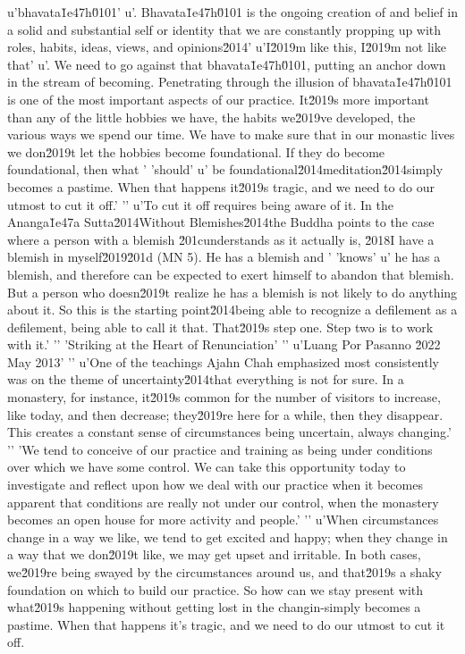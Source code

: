 u'bhavata\u1e47h\u0101'
u'. Bhavata\u1e47h\u0101 is the ongoing creation of and belief in a solid and substantial self or identity that we are constantly propping up with roles, habits, ideas, views, and opinions\u2014'
u'I\u2019m like this, I\u2019m not like that'
u'. We need to go against that bhavata\u1e47h\u0101, putting an anchor down in the stream of becoming. Penetrating through the illusion of bhavata\u1e47h\u0101 is one of the most important aspects of our practice. It\u2019s more important than any of the little hobbies we have, the habits we\u2019ve developed, the various ways we spend our time. We have to make sure that in our monastic lives we don\u2019t let the hobbies become foundational. If they do become foundational, then what '
'should'
u' be foundational\u2014meditation\u2014simply becomes a pastime. When that happens it\u2019s tragic, and we need to do our utmost to cut it off.'
'\n'
u'To cut it off requires being aware of it. In the Ananga\u1e47a Sutta\u2014Without Blemishes\u2014the Buddha points to the case where a person with a blemish \u201cunderstands as it actually is, \u2018I have a blemish in myself\u2019\u201d (MN 5). He has a blemish and '
'knows'
u' he has a blemish, and therefore can be expected to exert himself to abandon that blemish. But a person who doesn\u2019t realize he has a blemish is not likely to do anything about it. So this is the starting point\u2014being able to recognize a defilement as a defilement, being able to call it that. That\u2019s step one. Step two is to work with it.'
'\n'
'Striking at the Heart of Renunciation'
'\n'
u'Luang Por Pasanno \u2022 May 2013'
'\n'
u'One of the teachings Ajahn Chah emphasized most consistently was on the theme of uncertainty\u2014that everything is not for sure. In a monastery, for instance, it\u2019s common for the number of visitors to increase, like today, and then decrease; they\u2019re here for a while, then they disappear. This creates a constant sense of circumstances being uncertain, always changing.'
'\n'
'We tend to conceive of our practice and training as being under conditions over which we have some control. We can take this opportunity today to investigate and reflect upon how we deal with our practice when it becomes apparent that conditions are really not under our control, when the monastery becomes an open house for more activity and people.'
'\n'
u'When circumstances change in a way we like, we tend to get excited and happy; when they change in a way that we don\u2019t like, we may get upset and irritable. In both cases, we\u2019re being swayed by the circumstances around us, and that\u2019s a shaky foundation on which to build our practice. So how can we stay present with what\u2019s happening without getting lost in the changin-simply becomes a pastime. When that 
happens it's tragic, and we need to do our utmost to cut it off.

